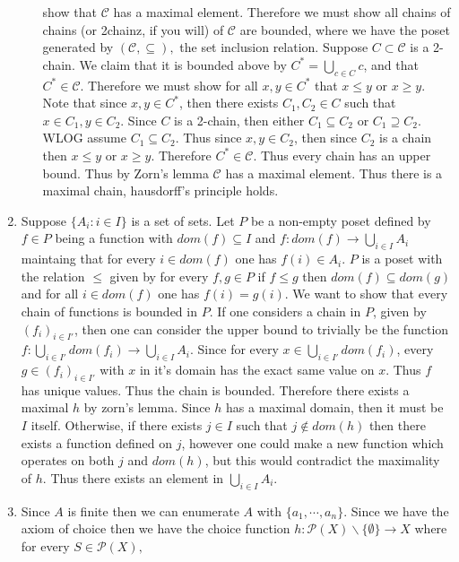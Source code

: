 \documentclass[12pt, letterpaper]{article}
\newcommand{\Po}{\mathcal{P}}
\begin{document}
\begin{enumerate}
\begin{itemize}
		show that $\mathcal{C}$ has a maximal element.  Therefore we must show 
		all chains of chains (or 2chainz, if you will) of $\mathcal{C}$ are bounded, where we have the poset generated by $(\mathcal{C},\subseteq),$ the 
		set inclusion relation.  Suppose $C \subset \mathcal{C}$ is a 2-chain.  
		We claim that it is bounded above by $C^* = \bigcup_{c \in C} c$, and 
		that $C^* \in \mathcal{C}$.  Therefore we must show for all $x,y \in C^{*}$
		that $x \leq y$ or $x \geq y$.  Note that since $x,y \in C^{*}$, then 
		there exists $C_1,C_2 \in C$ such that $x \in C_1, y \in C_2$.  
		Since $C$ is a 2-chain, then either $C_1 \subseteq C_2$ or $C_1 \supseteq C_2$.  
		WLOG assume $C_1 \subseteq C_2$.  Thus since $x,y \in C_2$, then since 
		$C_2$ is a chain then $x\leq y$ or $x \geq y$.  Therefore $C^* \in \mathcal{C}$.
		Thus every chain has an upper bound.  Thus by Zorn's lemma $\mathcal{C}$
		has a maximal element.  Thus there is a maximal chain, hausdorff's principle holds.     
	\end{itemize}
	\item Suppose $\{A_i : i \in I\}$ is a set of sets.  Let $P$ be a non-empty
	poset defined by $f \in P$ being a function with $dom(f) \subseteq I$ and 
	$f : dom(f) \to \bigcup_{i \in I} A_i$ maintaing that for every $i \in dom(f)$
	one has $f(i) \in A_i$.  $P$ is a poset with the relation $\leq$ given by 
	for every $f,g \in P$ if $f \leq g$ then $dom(f) \subseteq dom(g)$ and 
	for all $i \in dom(f)$ one has $f(i) = g(i)$.  We want to show that 
	every chain of functions is bounded in $P$.  If one considers a chain 
	in $P$, given by $(f_i)_{i \in I'}$, then one can consider the upper bound to 
	trivially be the function $f: \bigcup_{i \in I'} dom(f_i) \to \bigcup_{i \in I} A_i $.
	Since for every $x \in \bigcup_{i \in I'} dom(f_i)$, every $g \in (f_i)_{i \in I'}$ with $x$ in it's domain has the exact same value on $x$.  Thus $f$ has unique values.  Thus the chain is bounded.  Therefore there exists a maximal $h$ by zorn's lemma.
	Since $h$ has a maximal domain, then it must be $I$ itself.  Otherwise, 
	if there exists $j \in I$ such that $j \not \in dom(h)$ then there exists
	a function defined on $j$, however one could make a new function which operates 
	on both $j$ and $dom(h)$, but this would contradict the maximality of $h$.  
	Thus there exists an element in $\bigcup_{i \in I}A_i$.     
	\item Since $A$ is finite then we can enumerate $A$ with $\{a_1,\cdots,a_n\}$.
	Since we have the axiom of choice then we have the choice function 
	$h : \Po(X) \backslash \{\emptyset\} \to X$ where for every $S \in \Po(X),$

\end{enumerate}
\end{document}
